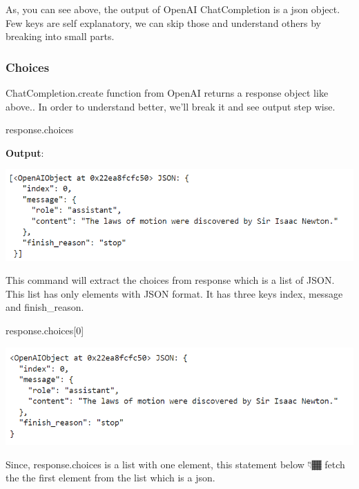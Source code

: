\documentclass[
  letterpaper,
  DIV=11,
  numbers=noendperiod]{scrreprt}
\newenvironment{Shaded}{\begin{snugshade}}{\end{snugshade}}
\newcommand{\DecValTok}[1]{\textcolor[rgb]{0.68,0.00,0.00}{#1}}
\newcommand{\NormalTok}[1]{\textcolor[rgb]{0.00,0.23,0.31}{#1}}
\begin{document}
As, you can see above, the output of OpenAI ChatCompletion is a json
object. Few keys are self explanatory, we can skip those and understand
others by breaking into small parts.

\hypertarget{choices}{%
\subsubsection{Choices}\label{choices}}

ChatCompletion.create function from OpenAI returns a response object
like above.. In order to understand better, we'll break it and see
output step wise.

\begin{Shaded}
\begin{Highlighting}[]
\NormalTok{response.choices}
\end{Highlighting}
\end{Shaded}

\textbf{Output}:

\includegraphics{images/ch2/2_1_response_object.png}

This command will extract the choices from response which is a list of
JSON. This list has only elements with JSON format. It has three keys
index, message and finish\_reason.

\begin{Shaded}
\begin{Highlighting}[]
\NormalTok{response.choices[}\DecValTok{0}\NormalTok{]}
\end{Highlighting}
\end{Shaded}

\includegraphics{images/ch2/2_2_response_object.png}

Since, response.choices is a list with one element, this statement below
👇🏾 fetch the the first element from the list which is a json.
\end{document}
